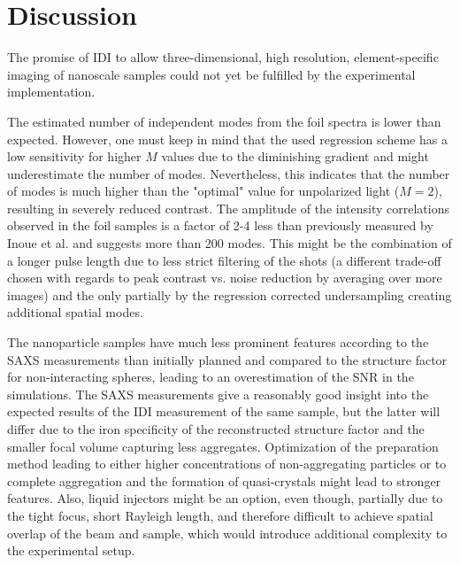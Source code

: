 \chapter{Discussion}
The promise of IDI to allow three-dimensional, high resolution, element-specific imaging of nanoscale samples could not yet be fulfilled by the experimental implementation.

The estimated number of independent modes from the foil spectra is lower than expected. However, one must keep in mind that the used regression scheme has a low sensitivity for higher $M$ values due to the diminishing gradient and might underestimate the number of modes. Nevertheless, this indicates that the number of modes is much higher than the "optimal" value for unpolarized light ($M=2$), resulting in severely reduced contrast. The amplitude of the intensity correlations observed in the foil samples is a factor of 2-4 less than previously measured by Inoue et al. and suggests more than 200 modes. This might be the combination of a longer pulse length due to less strict filtering of the shots (a different trade-off chosen with regards to peak contrast vs. noise reduction by averaging over more images) and the only partially by the regression corrected undersampling creating additional spatial modes. 

The nanoparticle samples have much less prominent features according to the SAXS measurements than initially planned and compared to the structure factor for non-interacting spheres, leading to an overestimation of the SNR in the simulations. The SAXS measurements give a reasonably good insight into the expected results of the IDI measurement of the same sample, but the latter will differ due to the iron specificity of the reconstructed structure factor and the smaller focal volume capturing less aggregates. Optimization of the preparation method leading to either higher concentrations of non-aggregating particles or to complete aggregation and the formation of quasi-crystals might lead to stronger features. Also, liquid injectors might be an option, even though, partially due to the tight focus, short Rayleigh length, and therefore difficult to achieve spatial overlap of the beam and sample, which would introduce additional complexity to the experimental setup.

